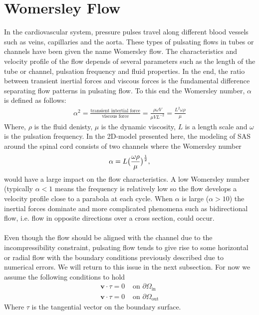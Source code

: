 \section{Womersley Flow}
In the cardiovascular system, pressure pulses travel along different blood vessels such as veins, capillaries and the aorta. These types of pulsating flows in tubes or channels have been given the name Womersley flow. The characteristics and velocity profile of the flow depends of several parameters such as the length of the tube or channel, pulsation frequency and fluid properties. In the end, the ratio between transient inertial forces and viscous forces is the fundamental difference separating flow patterns in pulsating flow. To this end the Womersley number, $\alpha$ is defined as follows:
\begin{align}
\alpha^2 = \frac{\text{transient intertial force}}{\text{viscous force}} = \frac{\rho\omega V}{\mu V L^{-2}} = \frac{L^2 \omega \rho}{\mu}
\end{align}
Where, $\rho$ is the fluid denisty, $\mu$ is the dynamic viscosity, $L$ is a length scale and $\omega$ is the pulsation frequency. In the 2D-model presented here, the modeling of SAS around the spinal cord consists of two channels where the Womersley number
\begin{align}
\alpha = L\big{(}\frac{\omega \rho}{\mu}\big{)}^{\frac{1}{2}},
\end{align}
would have a large impact on the flow characteristics. A low Womersley number (typically $\alpha < 1$ means the frequency is relatively low so the flow develops a velocity profile close to a parabola at each cycle. When $\alpha$ is large ($\alpha > 10$) the inertial forces dominate and more complicated phenomena such as bidirectional flow, i.e. flow in opposite directions over a cross section, could occur. 
\\
\\
Even though the flow should be aligned with the channel due to the incompressibility constraint, pulsating flow tends to give rise to some horizontal or radial flow with the boundary conditions previously described due to numerical errors. We will return to this issue in the next subsection. For now we assume the following conditions to hold 
\begin{align}
\mathbf{v}\cdot \tau = 0 & \text{ on } \partial \Omega_{\text{in}} \\
\mathbf{v}\cdot \tau = 0 & \text{ on } \partial \Omega_{\text{out}} \label{P_out}
\end{align}
Where $\tau$ is the tangential vector on the boundary surface.
